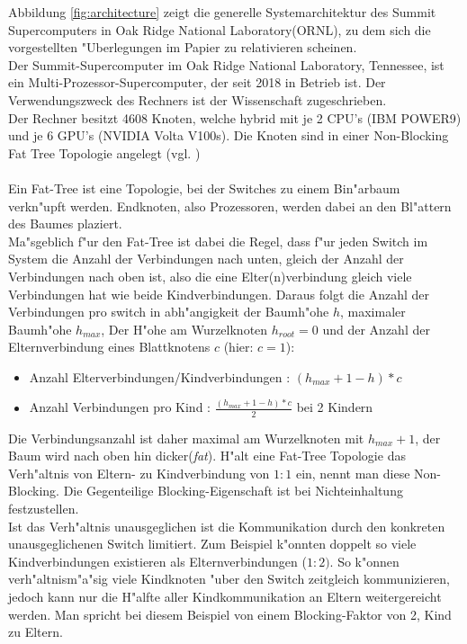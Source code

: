 Abbildung \ref{fig:architecture} zeigt die generelle Systemarchitektur des Summit Supercomputers in Oak Ridge National Laboratory(ORNL), zu dem sich die vorgestellten "Uberlegungen im Papier zu relativieren scheinen.\\
Der Summit-Supercomputer im Oak Ridge National Laboratory, Tennessee, ist ein Multi-Prozessor-Supercomputer, der seit 2018 in Betrieb ist. Der Verwendungszweck des Rechners ist der Wissenschaft zugeschrieben.
\\
Der Rechner besitzt 4608 Knoten, welche hybrid mit je 2 CPU's (IBM POWER9) und je 6 GPU's (NVIDIA Volta V100s). Die Knoten sind in einer Non-Blocking Fat Tree Topologie angelegt (vgl. \cite{osummit})\\
\\
Ein Fat-Tree ist eine Topologie, bei der Switches zu einem Bin"arbaum verkn"upft werden. Endknoten, also Prozessoren, werden dabei an den Bl"attern des Baumes plaziert.\\
Ma"sgeblich f"ur den Fat-Tree ist dabei die Regel, dass f"ur jeden Switch im System die Anzahl der Verbindungen nach unten, gleich der Anzahl der Verbindungen nach oben ist, also die eine Elter(n)verbindung gleich viele Verbindungen hat wie beide Kindverbindungen. Daraus folgt die Anzahl der Verbindungen pro switch in abh"angigkeit der Baumh"ohe $h$, maximaler Baumh"ohe $h_{max}$, Der H"ohe am Wurzelknoten $h_{root}=0$ und der Anzahl der Elternverbindung eines Blattknotens $c$ (hier: $c=1$):
\begin{itemize}
	\item Anzahl Elterverbindungen/Kindverbindungen : $(h_{max}+1-h)*c$
	\item Anzahl Verbindungen pro Kind : $\frac{(h_{max}+1-h)*c}{2}$ bei 2 Kindern
\end{itemize}
Die Verbindungsanzahl ist daher maximal am Wurzelknoten mit $h_{max}+1$, der Baum wird nach oben hin \glqq dicker\grqq (\textit{fat}).
H"alt eine Fat-Tree Topologie das Verh"altnis von Eltern- zu Kindverbindung von $1:1$ ein, nennt man diese Non-Blocking. Die Gegenteilige Blocking-Eigenschaft ist bei Nichteinhaltung festzustellen.\\
Ist das Verh"altnis unausgeglichen ist die Kommunikation durch den konkreten unausgeglichenen Switch limitiert. Zum Beispiel k"onnten doppelt so viele Kindverbindungen existieren als Elternverbindungen ($1:2)$. So k"onnen verh"altnism"a"sig viele Kindknoten "uber den Switch zeitgleich kommunizieren, jedoch kann nur die H"alfte aller Kindkommunikation an Eltern weitergereicht werden. Man spricht bei diesem Beispiel von einem Blocking-Faktor von 2, Kind zu Eltern.\\
